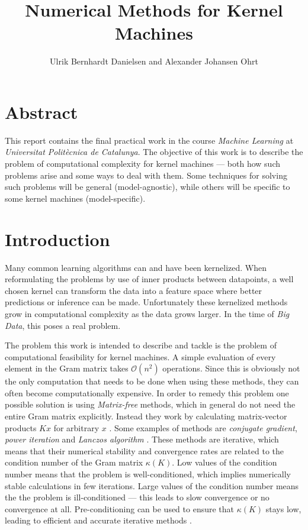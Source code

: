 \documentclass{article}
\title{Numerical Methods for Kernel Machines}
\author{Ulrik Bernhardt Danielsen and Alexander Johansen Ohrt}
\theoremstyle{plain}
\theoremstyle{definition}
\theoremstyle{remark}
\begin{document}
\maketitle

\tableofcontents

\newpage


\section{Abstract}
This report contains the final practical work in the course \textit{Machine Learning} at \textit{Universitat Politècnica de Catalunya}.
The objective of this work is to describe the problem of computational complexity for kernel machines — both how such problems arise and some ways to deal with them.
Some techniques for solving such problems will be general (model-agnostic), while others will be specific to some kernel machines (model-specific). 


\section{Introduction}
Many common learning algorithms can and have been kernelized.
When reformulating the problems by use of inner products between datapoints, a well chosen kernel can transform the data into a feature space where better predictions or inference can be made.
Unfortunately these kernelized methods grow in computational complexity as the data grows larger. In the time of \textit{Big Data}, this poses a real problem.

The problem this work is intended to describe and tackle is the problem of computational feasibility for kernel machines. A simple evaluation of every element in the Gram matrix takes $\mathcal{O}(n^2)$ operations. Since this is obviously not the only computation that needs to be done when using these methods, they can often become computationally expensive. In order to remedy this problem one possible solution is using \textit{Matrix-free} methods, which in general do not need the entire Gram matrix explicitly. Instead they work by calculating matrix-vector products $Kx$ for arbitrary $x$ \cite{davies}. Some examples of methods are \textit{conjugate gradient}, \textit{power iteration} and \textit{Lanczos algorithm} \cite{wiki:Matrix-free_methods}. These methods are iterative, which means that their numerical stability and convergence rates are related to the condition number of the Gram matrix $\kappa(K)$. Low values of the condition number means that the problem is well-conditioned, which implies numerically stable calculations in few iterations. Large values of the condition number means the the problem is ill-conditioned — this leads to slow convergence or no convergence at all. Pre-conditioning can be used to ensure that $\kappa(K)$ stays low, leading to efficient and accurate iterative methods \cite{davies}.
\end{document}
